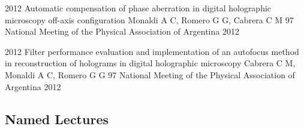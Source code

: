 \documentclass[11pt,a4paper]{moderncv}
\begin{document}
        \cventry                                                                 %
            {2012}                                                               %
            {                                                                    %
                Automatic compensation of phase aberration in digital            %
                    holographic microscopy off-axis configuration                %
            }                                                                    %
            {                                                                    %
                Monaldi A C, Romero G G, Cabrera C M                             %
            }                                                                    %
            {97 National Meeting of the Physical Association of Argentina}       %
            {2012}                                                               %
            {}                                                                   %

        \cventry                                                                 %
            {2012}                                                               %
            {                                                                    %
                Filter performance evaluation and implementation of an           %
                autofocus method in reconstruction of holograms in digital       %
                holographic microscopy                                           %
            }                                                                    %
            {Cabrera C M, Monaldi A C, Romero G G}                               %
            {97 National Meeting of the Physical Association of Argentina}       %
            {2012}                                                               %
            {}                                                                   %


\subsection{Named Lectures}                                                      %
\end{document}
